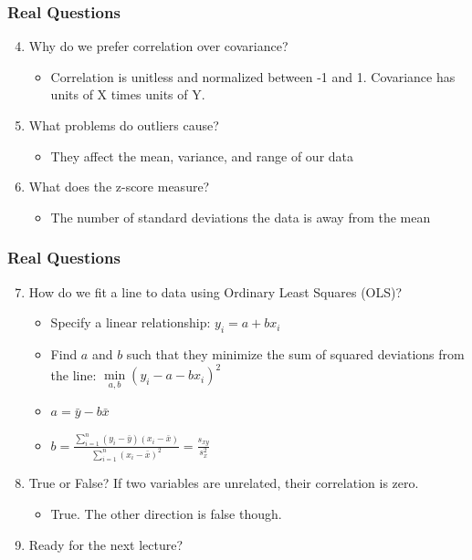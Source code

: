 \documentclass{beamer}
\begin{document}
\begin{frame}
\frametitle{Real Questions}
    \begin{enumerate}[<+- | alert@+>]
    \setcounter{enumi}{3}
		\item Why do we prefer correlation over covariance?
        	\begin{itemize}
        		\item Correlation is unitless and normalized between -1 and 1. Covariance has units of X times units of Y.
        	\end{itemize}
		\item What problems do outliers cause?
			\begin{itemize}
				\item They affect the mean, variance, and range of our data
			\end{itemize}
		\item What does the z-score measure?
			\begin{itemize}
				\item The number of standard deviations the data is away from the mean
			\end{itemize}    
		\end{enumerate}
\end{frame} 

\begin{frame}
\frametitle{Real Questions}
    \begin{enumerate}[<+- | alert@+>]
    \setcounter{enumi}{6}
		\item How do we fit a line to data using Ordinary Least Squares (OLS)?
			\begin{itemize}
				\item Specify a linear relationship: $y_i = a + bx_i$
				\item Find $a$ and $b$ such that they minimize the sum of squared deviations from the line: $\min\limits_{a, b} (y_i - a - bx_i)^2$
				\item $a = \bar{y} - b \bar{x}$
				\item $b = \frac{\sum_{i = 1}^n (y_i - \bar{y})(x_i - \bar{x})}{\sum_{i = 1}^n (x_i - \bar{x})^2} = \frac{s_{xy}}{s_x^2}$
			\end{itemize}
		\item True or False? If two variables are unrelated, their correlation is zero.
			\begin{itemize}
				\item True. The other direction is false though.
			\end{itemize}
		\item Ready for the next lecture?
		\end{enumerate}
\end{frame} 
\end{document}
